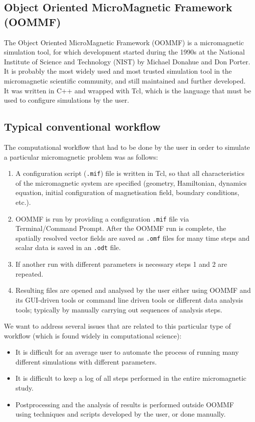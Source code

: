 \documentclass{deliverablereport}
\begin{document}
\subsection{Object Oriented MicroMagnetic Framework (OOMMF)}

The Object Oriented MicroMagnetic Framework (OOMMF) is a micromagnetic
simulation tool, for which development started during the 1990s at the
National Institute of Science and Technology (NIST) by Michael Donahue
and Don Porter. It is probably the most widely used and most trusted
simulation tool in the micromagnetic scientific community, and still
maintained and further developed. It was
written in C++ and wrapped with Tcl, which is the language that must
be used to configure simulations by the user.

\subsection{Typical conventional workflow}

The computational workflow that had to be done by the user in order to simulate a
particular micromagnetic problem was as follows:

\begin{enumerate}
\item A configuration script (\texttt{.mif}) file is written in Tcl,
  so that all characteristics of the micromagnetic system are
  specified (geometry, Hamiltonian, dynamics equation, initial
  configuration of magnetisation field, boundary conditions, etc.).
\item OOMMF is run by providing a configuration \texttt{.mif} file via
  Terminal/Command Prompt. After the OOMMF run is complete, the
  spatially resolved vector fields are saved as \texttt{.omf} files
  for many time steps and scalar data is saved in an \texttt{.odt}
  file.
\item If another run with different parameters is necessary steps 1
  and 2 are repeated.
\item Resulting files are opened and analysed by the user either using
  OOMMF and its GUI-driven tools or command line driven tools or
  different data analysis tools; typically by manually carrying out
  sequences of analysis steps.
\end{enumerate}

We want to address several issues that are related
to this particular type of workflow (which is found widely in
computational science):
\begin{itemize}
\item It is difficult for an average user to automate the process
of running many different simulations with different parameters.
\item It is difficult to keep a log of all steps performed in the
entire micromagnetic study.
\item Postprocessing and the analysis of results is performed outside
OOMMF using techniques and scripts developed by the user, or done manually.
\end{itemize}
\end{document}
